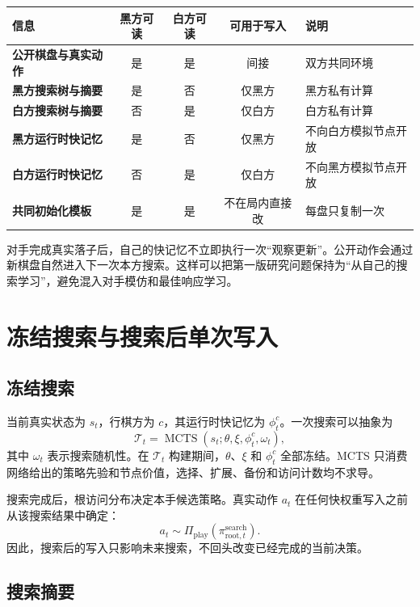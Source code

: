 \documentclass[UTF8,11pt,a4paper]{ctexart}
\newcommand{\slow}{\theta}
\newcommand{\metaweights}{\xi}
\newcommand{\MCTS}{\operatorname{MCTS}}
\begin{document}
\begin{center}
\begin{tabularx}{0.94\textwidth}{>{\bfseries}p{}cccX}
\toprule
信息 & 黑方可读 & 白方可读 & 可用于写入 & 说明 \\
\midrule
公开棋盘与真实动作 & 是 & 是 & 间接 & 双方共同环境 \\
黑方搜索树与摘要 & 是 & 否 & 仅黑方 & 黑方私有计算 \\
白方搜索树与摘要 & 否 & 是 & 仅白方 & 白方私有计算 \\
黑方运行时快记忆 & 是 & 否 & 仅黑方 & 不向白方模拟节点开放 \\
白方运行时快记忆 & 否 & 是 & 仅白方 & 不向黑方模拟节点开放 \\
共同初始化模板 & 是 & 是 & 不在局内直接改 & 每盘只复制一次 \\
\bottomrule
\end{tabularx}
\end{center}

对手完成真实落子后，自己的快记忆不立即执行一次“观察更新”。公开动作会通过新棋盘自然进入下一次本方搜索。这样可以把第一版研究问题保持为“从自己的搜索学习”，避免混入对手模仿和最佳响应学习。

\section{冻结搜索与搜索后单次写入}

\subsection{冻结搜索}

当前真实状态为 $s_t$，行棋方为 $c$，其运行时快记忆为 $\phi^c_t$。一次搜索可以抽象为
\[
  \mathcal T_t
  =\MCTS\!\left(s_t;\slow,\metaweights,\phi^c_t,\omega_t\right),
\]
其中 $\omega_t$ 表示搜索随机性。在 $\mathcal T_t$ 构建期间，$\slow$、$\metaweights$ 和 $\phi^c_t$ 全部冻结。MCTS 只消费网络给出的策略先验和节点价值，选择、扩展、备份和访问计数均不求导。

搜索完成后，根访问分布决定本手候选策略。真实动作 $a_t$ 在任何快权重写入之前从该搜索结果中确定：
\[
  a_t\sim\Pi_{\mathrm{play}}\!\left(\pi^{\mathrm{search}}_{\mathrm{root},t}\right).
\]
因此，搜索后的写入只影响未来搜索，不回头改变已经完成的当前决策。

\subsection{搜索摘要}
\end{document}
